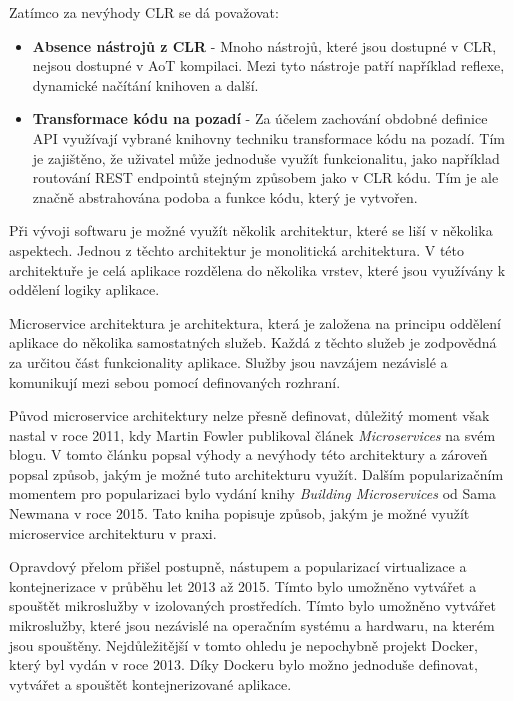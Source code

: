 Zatímco za nevýhody CLR se dá považovat:
\begin{itemize}
    \item  \textbf{Absence nástrojů z CLR} - Mnoho nástrojů, které jsou dostupné v CLR, nejsou dostupné v AoT kompilaci. Mezi tyto nástroje patří například reflexe, dynamické načítání knihoven a další.
    \item \textbf{Transformace kódu na pozadí} - Za účelem zachování obdobné definice API využívají vybrané knihovny techniku transformace kódu na pozadí. Tím je zajištěno, že uživatel může jednoduše využít funkcionalitu, jako například routování REST endpointů stejným způsobem jako v CLR kódu. Tím je ale značně abstrahována podoba a funkce kódu, který je vytvořen.
\end{itemize}

Při vývoji softwaru je možné využít několik architektur, které se liší v několika aspektech. Jednou z těchto architektur je monolitická architektura. V této architektuře je celá aplikace rozdělena do několika vrstev, které jsou využívány k oddělení logiky aplikace. \cite{monolith}

Microservice architektura je architektura, která je založena na principu oddělení aplikace do několika samostatných služeb. Každá z těchto služeb je zodpovědná za určitou část funkcionality aplikace. Služby jsou navzájem nezávislé a komunikují mezi sebou pomocí definovaných rozhraní. \cite{microservice}

Původ microservice architektury nelze přesně definovat, důležitý moment však nastal v roce 2011, kdy Martin Fowler publikoval článek \textit{Microservices} na svém blogu. V tomto článku popsal výhody a nevýhody této architektury a zároveň popsal způsob, jakým je možné tuto architekturu využít. \cite{fowler} Dalším popularizačním momentem pro popularizaci bylo vydání knihy \textit{Building Microservices} od Sama Newmana v roce 2015. Tato kniha popisuje způsob, jakým je možné využít microservice architekturu v praxi. \cite{newman}

Opravdový přelom přišel postupně, nástupem a popularizací virtualizace a kontejnerizace v průběhu let 2013 až 2015. Tímto bylo umožněno vytvářet a spouštět mikroslužby v izolovaných prostředích. Tímto bylo umožněno vytvářet mikroslužby, které jsou nezávislé na operačním systému a hardwaru, na kterém jsou spouštěny. Nejdůležitější v tomto ohledu je nepochybně projekt Docker, který byl vydán v roce 2013. Díky Dockeru bylo možno jednoduše definovat, vytvářet a spouštět kontejnerizované aplikace. \cite{docker}


